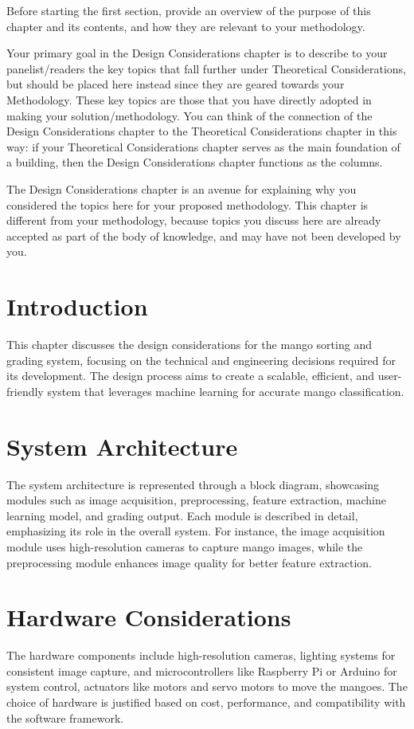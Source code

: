 Before starting the first section, provide an overview of the purpose of this chapter and its contents, and how they are relevant to your methodology. 

Your primary goal in the Design Considerations chapter is to describe to your panelist/readers the key topics that fall further under Theoretical Considerations, but should be placed here instead since they are geared towards your Methodology. These key topics are those that you have directly adopted in making your solution/methodology.  You can think of the connection of the Design Considerations chapter to the Theoretical Considerations chapter in this way: if your Theoretical Considerations chapter serves as the main foundation of a building, then the Design Considerations chapter functions as the columns. 

The  Design Considerations chapter is an avenue for explaining why you considered the topics here for your proposed methodology. This chapter is different from your methodology, because topics you discuss here are already accepted as part of the body of knowledge, and may have not been developed by you.  

\section{Introduction}
This chapter discusses the design considerations for the mango sorting and grading system, focusing on the technical and engineering decisions required for its development. The design process aims to create a scalable, efficient, and user-friendly system that leverages machine learning for accurate mango classification.
\section{System Architecture}
The system architecture is represented through a block diagram, showcasing modules such as image acquisition, preprocessing, feature extraction, machine learning model, and grading output. Each module is described in detail, emphasizing its role in the overall system. For instance, the image acquisition module uses high-resolution cameras to capture mango images, while the preprocessing module enhances image quality for better feature extraction.
\section{Hardware Considerations}
The hardware components include high-resolution cameras, lighting systems for consistent image capture, and microcontrollers like Raspberry Pi or Arduino for system control, actuators like motors and servo motors to move the mangoes. The choice of hardware is justified based on cost, performance, and compatibility with the software framework.
